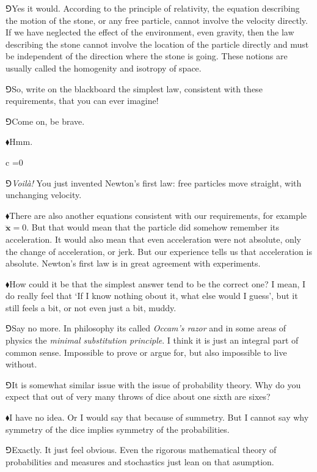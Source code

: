 \documentclass[11pt,oneside%
]{memoir}
\newenvironment{eqna}{\begin{IEEEeqnarray*}{c}}{\end{IEEEeqnarray*}\ignorespacesafterend}
\renewcommand{\vec}[1]{\mathbf{#1}}
\newcommand{\hea}{\(\blacklozenge\)\;}
\newcommand{\heb}{\(\Game\)\;}
\begin{document}
\heb Yes it would. According to the principle of relativity, the equation describing the motion of the stone, or any free particle, cannot involve the velocity directly. If we have neglected the effect of the environment, even gravity, then the law describing the stone cannot involve the location of the particle directly and must be independent of the direction where the stone is going. These notions are usually called the homogenity and isotropy of space.

\heb So, write on the blackboard the simplest law, consistent with these requirements, that you can ever imagine!

\heb Come on, be brave.

\hea Hmm.
\begin{eqna}
    \ddot{\vec{x}}=0
\end{eqna}

\heb \emph{Voil\`a!} You just invented Newton's first law: free particles move straight, with unchanging velocity.

\hea There are also another equations consistent with our requirements, for example \(\dddot{\vec{x}}=0\). But that would mean that the particle did somehow remember its acceleration. It would also mean that even acceleration were not absolute, only the change of acceleration, or jerk. But our experience tells us that acceleration is absolute. Newton's first law is in great agreement with experiments.

\hea How could it be that the simplest answer tend to be the correct one? I mean, I do really feel that `If I know nothing obout it, what else would I guess', but it still feels a bit, or not even just a bit, muddy.

\heb Say no more. In philosophy its called \emph{Occam's razor} and in some areas of physics the \emph{minimal substitution principle}. I think it is just an integral part of common sense. Impossible to prove or argue for, but also impossible to live without.

\heb It is somewhat similar issue with the issue of probability theory. Why do you expect that out of very many throws of dice about one sixth are sixes?

\hea I have no idea. Or I would say that because of summetry. But I cannot say why symmetry of the dice implies symmetry of the probabilities.

\heb Exactly. It just feel obvious. Even the rigorous mathematical theory of probabilities and measures and stochastics just lean on that asumption.
\end{document}
